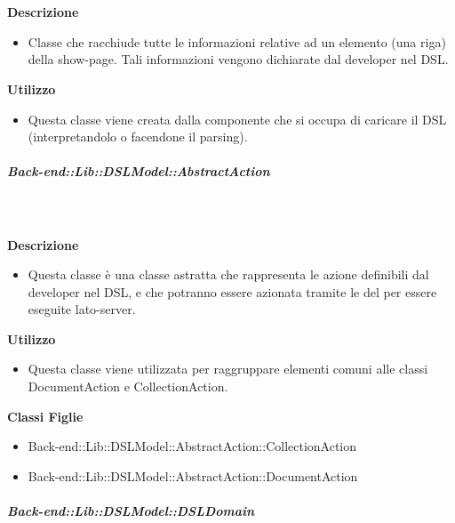         \textbf{\\ \\ Descrizione} 
          \begin{itemize}
            \item[] Classe che racchiude tutte le informazioni relative ad un elemento (una riga) della show-page. Tali informazioni vengono dichiarate dal developer nel DSL.
          \end{itemize}      
        \textbf{Utilizzo}  
          \begin{itemize}
            \item[] Questa classe viene creata dalla componente che si occupa di caricare il DSL (interpretandolo o facendone il parsing). 
          \end{itemize}
      \subparagraph{Back-end::Lib::DSLModel::AbstractAction}
        
        \textbf{\\ \\ Descrizione} 
          \begin{itemize}
            \item[] Questa classe è una classe astratta che rappresenta le azione definibili dal developer nel DSL, e che potranno essere azionata tramite le  del  per essere eseguite lato-server.
          \end{itemize}      
        \textbf{Utilizzo}  
          \begin{itemize}
            \item[] Questa classe viene utilizzata per raggruppare elementi comuni alle classi DocumentAction e CollectionAction.
          \end{itemize}
          \textbf{Classi Figlie}
          \begin{itemize}
              \item{Back-end::Lib::DSLModel::AbstractAction::CollectionAction}
              \item{Back-end::Lib::DSLModel::AbstractAction::DocumentAction}
          \end{itemize}
      \subparagraph{Back-end::Lib::DSLModel::DSLDomain}
        
